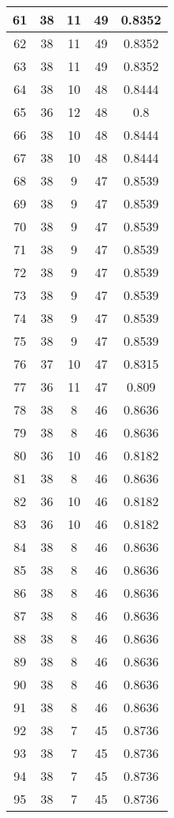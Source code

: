 \documentclass[letterpaper, 12pt]{article}
\begin{document}
\begin{longtable}{|c|c|c|c|c|}
\hline
61 & 38 & 11 & 49 & 0.8352 \\
\hline
62 & 38 & 11 & 49 & 0.8352 \\
\hline
63 & 38 & 11 & 49 & 0.8352 \\
\hline
64 & 38 & 10 & 48 & 0.8444 \\
\hline
65 & 36 & 12 & 48 & 0.8 \\
\hline
66 & 38 & 10 & 48 & 0.8444 \\
\hline
67 & 38 & 10 & 48 & 0.8444 \\
\hline
68 & 38 & 9 & 47 & 0.8539 \\
\hline
69 & 38 & 9 & 47 & 0.8539 \\
\hline
70 & 38 & 9 & 47 & 0.8539 \\
\hline
71 & 38 & 9 & 47 & 0.8539 \\
\hline
72 & 38 & 9 & 47 & 0.8539 \\
\hline
73 & 38 & 9 & 47 & 0.8539 \\
\hline
74 & 38 & 9 & 47 & 0.8539 \\
\hline
75 & 38 & 9 & 47 & 0.8539 \\
\hline
76 & 37 & 10 & 47 & 0.8315 \\
\hline
77 & 36 & 11 & 47 & 0.809 \\
\hline
78 & 38 & 8 & 46 & 0.8636 \\
\hline
79 & 38 & 8 & 46 & 0.8636 \\
\hline
80 & 36 & 10 & 46 & 0.8182 \\
\hline
81 & 38 & 8 & 46 & 0.8636 \\
\hline
82 & 36 & 10 & 46 & 0.8182 \\
\hline
83 & 36 & 10 & 46 & 0.8182 \\
\hline
84 & 38 & 8 & 46 & 0.8636 \\
\hline
85 & 38 & 8 & 46 & 0.8636 \\
\hline
86 & 38 & 8 & 46 & 0.8636 \\
\hline
87 & 38 & 8 & 46 & 0.8636 \\
\hline
88 & 38 & 8 & 46 & 0.8636 \\
\hline
89 & 38 & 8 & 46 & 0.8636 \\
\hline
90 & 38 & 8 & 46 & 0.8636 \\
\hline
91 & 38 & 8 & 46 & 0.8636 \\
\hline
92 & 38 & 7 & 45 & 0.8736 \\
\hline
93 & 38 & 7 & 45 & 0.8736 \\
\hline
94 & 38 & 7 & 45 & 0.8736 \\
\hline
95 & 38 & 7 & 45 & 0.8736 \\

\end{longtable}
\end{document}
